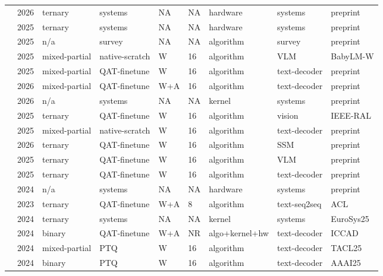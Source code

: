 \begin{landscape}
\begin{longtable}{p{3.2cm} p{1cm} p{1.9cm} p{2.2cm} p{2.2cm} p{1.3cm} p{2.2cm} p{2.1cm} p{2.5cm}}
\citet{Guan2026-TOM} & 2026 & ternary & systems & NA & NA & hardware & systems & preprint \\
\citet{Qiao2025-TeLLMev2} & 2025 & ternary & systems & NA & NA & hardware & systems & preprint \\
\citet{Jorgensen2025-ResourceEfficientLMs} & 2025 & n/\allowbreak{}a & survey & NA & NA & algorithm & survey & preprint \\
\citet{Aman2025-BitMar} & 2025 & mixed-partial & native-scratch & W & 16 & algorithm & VLM & Baby\allowbreak{}LM-W \\
\citet{Chen2025-R2Q} & 2025 & mixed-partial & QAT-finetune & W & 16 & algorithm & text-decoder & preprint \\
\citet{Zhang2026-EdgeRazor} & 2026 & mixed-partial & QAT-finetune & W+\allowbreak{}A & 16 & algorithm & text-decoder & preprint \\
\citet{Dehghankar2026-RSRcore} & 2026 & n/\allowbreak{}a & systems & NA & NA & kernel & systems & preprint \\
\citet{Grainge2025-TeTRAVPR} & 2025 & ternary & QAT-finetune & W & 16 & algorithm & vision & IEEE-RAL \\
\citet{Wang2025-iFairy} & 2025 & mixed-partial & native-scratch & W & 16 & algorithm & text-decoder & preprint \\
\citet{Ganesaraja2026-TernaryMamba} & 2026 & ternary & QAT-finetune & W & 16 & algorithm & SSM & preprint \\
\citet{Zhang2025-TernaryCLIP} & 2025 & ternary & QAT-finetune & W & 16 & algorithm & VLM & preprint \\
\citet{Steinmetz2025-ExtraRMSNorm} & 2025 & ternary & QAT-finetune & W & 16 & algorithm & text-decoder & preprint \\
\citet{Ortega2024-PIMAI} & 2024 & n/\allowbreak{}a & systems & NA & NA & hardware & systems & preprint \\
\citet{Liu2023-BinTernNLG} & 2023 & ternary & QAT-finetune & W+\allowbreak{}A & 8 & algorithm & text-seq2seq & ACL \\
\citet{Wei2024-TMAC} & 2024 & ternary & systems & NA & NA & kernel & systems & Euro\allowbreak{}Sys25 \\
\citet{Ji2024-BMTBAT} & 2024 & binary & QAT-finetune & W+\allowbreak{}A & NR & algo+\allowbreak{}kernel+\allowbreak{}hw & text-decoder & ICCAD \\
\citet{Xu2024-CRVQ} & 2024 & mixed-partial & PTQ & W & 16 & algorithm & text-decoder & TACL25 \\
\citet{Edalati2024-OAC} & 2024 & binary & PTQ & W & 16 & algorithm & text-decoder & AAAI25 \\

\end{longtable}
\end{landscape}
